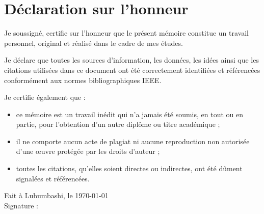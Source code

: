 \chapter*{Déclaration sur l'honneur}

Je soussigné, certifie sur l'honneur que le présent mémoire constitue un travail personnel, original et réalisé dans le cadre de mes études.

Je déclare que toutes les sources d'information, les données, les idées ainsi que les citations utilisées dans ce document ont été correctement identifiées et référencées conformément aux normes bibliographiques IEEE.

Je certifie également que :

\begin{itemize}
    \item ce mémoire est un travail inédit qui n’a jamais été soumis, en tout ou en partie, pour l’obtention d’un autre diplôme ou titre académique ;
    
    \item il ne comporte aucun acte de plagiat ni aucune reproduction non autorisée d’une œuvre protégée par les droits d’auteur ;
    
    \item toutes les citations, qu’elles soient directes ou indirectes, ont été dûment signalées et référencées.
\end{itemize}

\vspace{2.5cm}

\begin{flushright}
Fait à Lubumbashi, le \today\\[0.8cm]

Signature :\\[1.5cm]

\myName
\end{flushright}